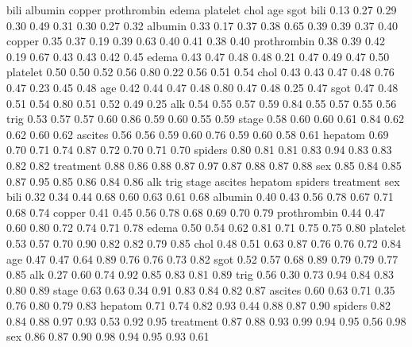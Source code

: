 \documentclass[article]{jss}
\begin{document}
\begin{Schunk}
\begin{Soutput}
            bili albumin copper prothrombin edema platelet chol  age sgot
bili        0.13    0.27   0.29        0.30  0.49     0.31 0.30 0.27 0.32
albumin     0.33    0.17   0.37        0.38  0.65     0.39 0.39 0.37 0.40
copper      0.35    0.37   0.19        0.39  0.63     0.40 0.41 0.38 0.40
prothrombin 0.38    0.39   0.42        0.19  0.67     0.43 0.43 0.42 0.45
edema       0.43    0.47   0.48        0.48  0.21     0.47 0.49 0.47 0.50
platelet    0.50    0.50   0.52        0.56  0.80     0.22 0.56 0.51 0.54
chol        0.43    0.43   0.47        0.48  0.76     0.47 0.23 0.45 0.48
age         0.42    0.44   0.47        0.48  0.80     0.47 0.48 0.25 0.47
sgot        0.47    0.48   0.51        0.54  0.80     0.51 0.52 0.49 0.25
alk         0.54    0.55   0.57        0.59  0.84     0.55 0.57 0.55 0.56
trig        0.53    0.57   0.57        0.60  0.86     0.59 0.60 0.55 0.59
stage       0.58    0.60   0.60        0.61  0.84     0.62 0.62 0.60 0.62
ascites     0.56    0.56   0.59        0.60  0.76     0.59 0.60 0.58 0.61
hepatom     0.69    0.70   0.71        0.74  0.87     0.72 0.70 0.71 0.70
spiders     0.80    0.81   0.81        0.83  0.94     0.83 0.83 0.82 0.82
treatment   0.88    0.86   0.88        0.87  0.97     0.87 0.88 0.87 0.88
sex         0.85    0.84   0.85        0.87  0.95     0.85 0.86 0.84 0.86
             alk trig stage ascites hepatom spiders treatment  sex
bili        0.32 0.34  0.44    0.68    0.60    0.63      0.61 0.68
albumin     0.40 0.43  0.56    0.78    0.67    0.71      0.68 0.74
copper      0.41 0.45  0.56    0.78    0.68    0.69      0.70 0.79
prothrombin 0.44 0.47  0.60    0.80    0.72    0.74      0.71 0.78
edema       0.50 0.54  0.62    0.81    0.71    0.75      0.75 0.80
platelet    0.53 0.57  0.70    0.90    0.82    0.82      0.79 0.85
chol        0.48 0.51  0.63    0.87    0.76    0.76      0.72 0.84
age         0.47 0.47  0.64    0.89    0.76    0.76      0.73 0.82
sgot        0.52 0.57  0.68    0.89    0.79    0.79      0.77 0.85
alk         0.27 0.60  0.74    0.92    0.85    0.83      0.81 0.89
trig        0.56 0.30  0.73    0.94    0.84    0.83      0.80 0.89
stage       0.63 0.63  0.34    0.91    0.83    0.84      0.82 0.87
ascites     0.60 0.63  0.71    0.35    0.76    0.80      0.79 0.83
hepatom     0.71 0.74  0.82    0.93    0.44    0.88      0.87 0.90
spiders     0.82 0.84  0.88    0.97    0.93    0.53      0.92 0.95
treatment   0.87 0.88  0.93    0.99    0.94    0.95      0.56 0.98
sex         0.86 0.87  0.90    0.98    0.94    0.95      0.93 0.61
\end{Soutput}
\end{Schunk}
\end{document}
